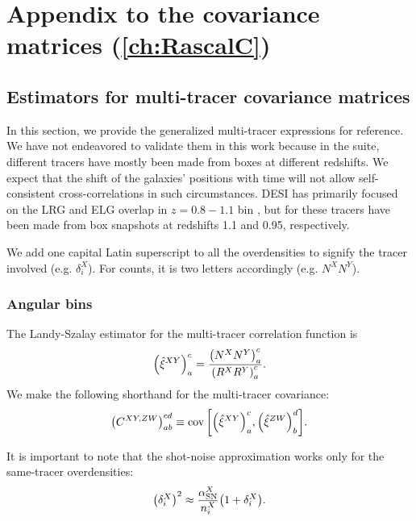 \chapter{Appendix to the covariance matrices\texorpdfstring{ (\cref{ch:RascalC})}{}}
\graphicspath{{RascalC-combined/}}

\section{Estimators for multi-tracer covariance matrices}
\label{sec:cov-estimation-extra}

In this section, we provide the generalized multi-tracer expressions for reference.
We have not endeavored to validate them in this work because in the \ezmocks{} suite, different tracers have mostly been made from boxes at different redshifts.
We expect that the shift of the galaxies' positions with time will not allow self-consistent cross-correlations in such circumstances.
DESI has primarily focused on the LRG and ELG overlap in $z=0.8-1.1$ bin \citep{KP4s5-Valcin}, but \ezmocks{} for these tracers have been made from box snapshots at redshifts 1.1 and 0.95, respectively.

We add one capital Latin superscript to all the overdensities to signify the tracer involved (e.g. $\delta^X_i$).
For counts, it is two letters accordingly (e.g. $N^XN^Y$).

\subsection{Angular bins}
\label{sec:cov-estimation-multi-smu}

The Landy-Szalay estimator for the multi-tracer correlation function is
\begin{equation} \label{eq:Landy-Szalay-binned-multi}
\qty(\hat\xi^{XY})_a^c = \frac{\qty(N^XN^Y)_a^c}{\qty(R^XR^Y)_a^c}.
\end{equation}
We make the following shorthand for the multi-tracer covariance:
\begin{equation} \label{eq:cov2x2_def-multi}
\qty(C^{XY,ZW})_{ab}^{cd} \equiv \operatorname{cov} \qty[\qty(\hat\xi^{XY})_a^c, \qty(\hat\xi^{ZW})_b^d].
\end{equation}

It is important to note that the shot-noise approximation works only for the same-tracer overdensities:
\begin{equation} \label{eq:shot-noise-approximation-multi}
\qty(\delta^X_i)^2 \approx \frac{\alpha_{\rm SN}^X}{n^X_i} \qty(1+\delta^X_i).
\end{equation}

